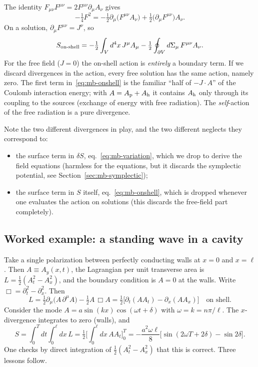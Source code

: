 The identity $F_{\mu\nu}F^{\mu\nu}=2F^{\mu\nu}\partial_\mu A_\nu$ gives
\begin{equation}
-\tfrac14F^2=-\tfrac12\partial_\mu\big(F^{\mu\nu}A_\nu\big)
+\tfrac12\big(\partial_\mu F^{\mu\nu}\big)A_\nu .
\end{equation}
On a solution, $\partial_\mu F^{\mu\nu}=J^\nu$, so
\begin{equation}
S_{\rm on\text{-}shell}
=-\tfrac12\int_V d^4x\,J^\mu A_\mu
-\tfrac12\oint_{\partial V}d\Sigma_\mu\,F^{\mu\nu}A_\nu .
\label{eq:mb-onshell}
\end{equation}
For the free field ($J=0$) the on-shell action is \emph{entirely} a
boundary term. If we discard divergences in the action, every free solution
has the same action, namely zero. The first term in~\eqref{eq:mb-onshell}
is the familiar ``half of $-J\!\cdot\!A$'' of the Coulomb interaction energy;
with $A=A_{\rm p}+A_{\rm h}$ it contains $A_{\rm h}$ only through its
coupling to the sources (exchange of energy with free radiation). The
\emph{self}-action of the free radiation is a pure divergence.

Note the two different divergences in play, and the two different
neglects they correspond to:
\begin{itemize}
\item the surface term in $\delta S$, eq.~\eqref{eq:mb-variation}, which
we drop to derive the field equations (harmless for the equations, but it
discards the symplectic potential, see Section~\ref{sec:mb-symplectic});
\item the surface term in $S$ itself, eq.~\eqref{eq:mb-onshell}, which is
dropped whenever one evaluates the action on solutions (this discards the
free-field part completely).
\end{itemize}

\subsection{Worked example: a standing wave in a cavity}
\label{sec:mb-example}

Take a single polarization between perfectly conducting walls at $x=0$ and
$x=\ell$. Then $A\equiv A_y(x,t)$, the Lagrangian per unit transverse area
is $L=\tfrac12(A_t^2-A_x^2)$, and the boundary condition is $A=0$ at the
walls. Write $\Box=\partial_t^2-\partial_x^2$. Then
\begin{equation}
L=\tfrac12\partial_\mu\big(A\,\partial^\mu A\big)-\tfrac12A\,\Box A
=\tfrac12\big[\partial_t(AA_t)-\partial_x(AA_x)\big]\quad\text{on shell.}
\end{equation}
Consider the mode $A=a\sin(kx)\cos(\omega t+\delta)$ with
$\omega=k=n\pi/\ell$. The $x$-divergence integrates to zero (walls), and
\begin{equation}
S=\int_0^T\!dt\int_0^\ell\!dx\,L
=\tfrac12\Big[\int_0^\ell\!dx\,AA_t\Big]_0^T
=-\frac{a^2\omega\ell}{8}\Big[\sin(2\omega T+2\delta)-\sin2\delta\Big].
\label{eq:mb-cavity-action}
\end{equation}
One checks by direct integration of $\tfrac12(A_t^2-A_x^2)$ that this is
correct. Three lessons follow.

